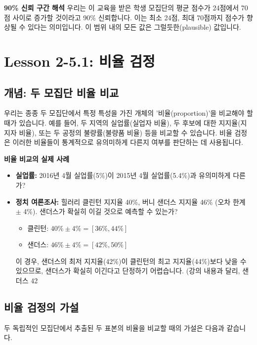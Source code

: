 \documentclass[11pt,a4paper]{article}
\begin{document}
\begin{summarybox}
\textbf{90\% 신뢰 구간 해석}
우리는 이 교육을 받은 학생 모집단의 평균 점수가 24점에서 70점 사이로 증가할 것이라고 90\% 신뢰합니다. 이는 최소 24점, 최대 70점까지 점수가 향상될 수 있다는 의미입니다. 이 범위 내의 모든 값은 그럴듯한(plausible) 값입니다.
\end{summarybox}

\newpage
\section*{Lesson 2-5.1: 비율 검정}

\subsection*{개념: 두 모집단 비율 비교}
우리는 종종 두 모집단에서 특정 특성을 가진 개체의 '비율(proportion)'을 비교해야 할 때가 있습니다. 예를 들어, 두 지역의 실업률(실업자 비율), 두 후보에 대한 지지율(지지자 비율), 또는 두 공정의 불량률(불량품 비율) 등을 비교할 수 있습니다. 비율 검정은 이러한 비율들이 통계적으로 유의미하게 다른지 여부를 판단하는 데 사용됩니다.

\begin{examplebox}
\textbf{비율 비교의 실제 사례}
\begin{itemize}
    \item \textbf{실업률:} 2016년 4월 실업률(5\%)이 2015년 4월 실업률(5.4\%)과 유의미하게 다른가?
    \item \textbf{정치 여론조사:} 힐러리 클린턴 지지율 40\%, 버니 샌더스 지지율 46\% (오차 한계 $\pm$ 4\%). 샌더스가 확실히 이길 것으로 예측할 수 있는가?
    \begin{itemize}
        \item 클린턴: $40\% \pm 4\% = [36\%, 44\%]$
        \item 샌더스: $46\% \pm 4\% = [42\%, 50\%]$
    \end{itemize}
    이 경우, 샌더스의 최저 지지율(42\%)이 클린턴의 최고 지지율(44\%)보다 낮을 수 있으므로, 샌더스가 확실히 이긴다고 단정하기 어렵습니다. (강의 내용과 달리, 샌더스 42%
\end{itemize}
\end{examplebox}

\subsection*{비율 검정의 가설}
두 독립적인 모집단에서 추출된 두 표본의 비율을 비교할 때의 가설은 다음과 같습니다.
\end{document}
